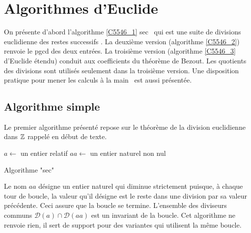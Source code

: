 \section{Algorithmes d'Euclide}
On présente d'abord l'algorithme \ref{C5546_1} \og sec\fg~ qui est une suite de divisions euclidienne des restes successifs . La deuxième version (algorithme \ref{C5546_2}) renvoie le pgcd des deux entrées. La troisième version (algorithme \ref{C5546_3} d'Euclide étendu) conduit aux coefficients du théorème de Bezout. Les quotients des divisions sont utilisés seulement dans la troisième version. Une disposition pratique pour mener les calculs \og à la main\fg~ est aussi présentée.
\subsection{Algorithme simple}
Le premier algorithme présenté repose sur le théorème de la division euclidienne dans $\mathbb{Z}$ rappelé en début de texte.\newline
{}
\begin{algorithm}
 $a\leftarrow$ un entier relatif\;
 $aa\leftarrow$ un entier naturel non nul\;
 \caption{Algorithme "sec"}
 \label{C5546_1}
\end{algorithm}

Le nom $aa$ désigne un entier naturel qui diminue strictement puisque, à chaque tour de boucle, la valeur qu'il désigne est le reste dans une division par sa valeur précédente. Ceci assure que la boucle se termine. L'ensemble des diviseurs communs $\mathcal{D}(a)\cap \mathcal{D}(aa)$ est un invariant de la boucle.\newline
Cet algorithme ne renvoie rien, il sert de support pour des variantes qui utilisent la même boucle.
 
